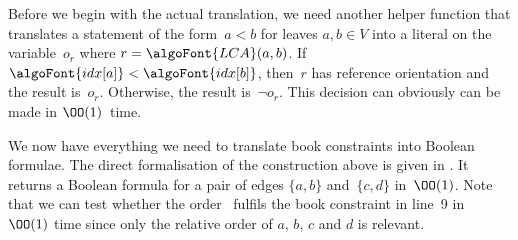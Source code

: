 \begin{myproof}
%
%
%
%
%

Before we begin with the actual translation, we need another helper function  that translates a statement
of the form~$a < b$ for leaves $a, b \in V$ into a literal on the variable~$o_r$ 
where $r = \algoFont{LCA}(a, b)$. If $\algoFont{idx[a]} < \algoFont{idx[b]}$, then~$r$ has reference orientation and the result is~$o_r$. Otherwise, the result is~$\lnot o_r$. This decision can obviously
can be made in $\OO(1)$~time.

%
%
%
%

We now have everything we need to translate book constraints into
Boolean formulae. The direct formalisation of the construction
above is given in . It returns
a Boolean formula for a pair of edges $\{a, b\}$ and~$\{c, d\}$
in~$\OO(1)$. Note that we can test whether the order~ fulfils
the book constraint in line~9 in~$\OO(1)$ time since only the relative
order of $a$, $b$, $c$ and $d$ is relevant.


\end{myproof}
